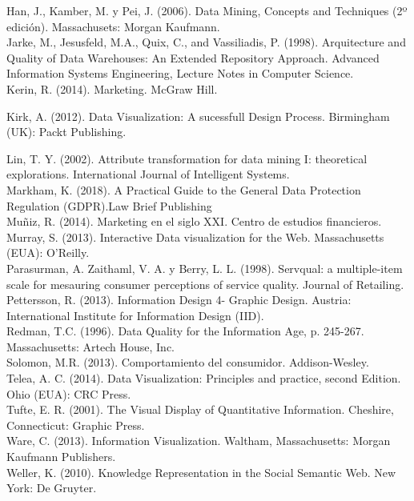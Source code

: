 Han, J., Kamber, M. y Pei, J. (2006). Data Mining, Concepts and Techniques (2º
edición). Massachusets: Morgan Kaufmann.\\

Jarke, M., Jesusfeld, M.A., Quix, C., and Vassiliadis, P. (1998). Arquitecture and Quality
of Data Warehouses: An Extended Repository Approach. Advanced Information Systems
Engineering, Lecture Notes in Computer Science.\\

Kerin, R. (2014). Marketing. McGraw Hill. 

Kirk, A. (2012). Data Visualization: A sucessfull Design Process. Birmingham (UK):
Packt Publishing.

Lin, T. Y. (2002). Attribute transformation for data mining I: theoretical explorations.
International Journal of Intelligent Systems.\\

Markham, K. (2018). A Practical Guide to the General Data Protection Regulation (GDPR).Law Brief Publishing \\

Muñiz, R. (2014). Marketing en el siglo XXI. Centro de estudios financieros. \\

Murray, S. (2013). Interactive Data visualization for the Web. Massachusetts (EUA):
O’Reilly.\\

Parasurman, A. Zaithaml, V. A. y Berry, L. L. (1998). Servqual: a multiple-item scale for
mesauring consumer perceptions of service quality. Journal of Retailing.\\ 

Pettersson, R. (2013). Information Design 4- Graphic Design. Austria: International
Institute for Information Design (IID).\\

Redman, T.C. (1996). Data Quality for the Information Age, p. 245-267. Massachusetts:
Artech House, Inc.\\

Solomon, M.R. (2013). Comportamiento del consumidor. Addison-Wesley.\\

Telea, A. C. (2014). Data Visualization: Principles and practice, second Edition. Ohio
(EUA): CRC Press. \\

Tufte, E. R. (2001). The Visual Display of Quantitative Information. Cheshire,
Connecticut: Graphic Press.\\

Ware, C. (2013). Information Visualization. Waltham, Massachusetts: Morgan
Kaufmann Publishers. \\

Weller, K. (2010). Knowledge Representation in the Social Semantic Web. New York:
De Gruyter. \\


